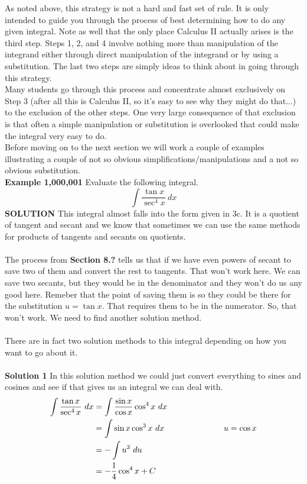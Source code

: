 \documentclass[11pt]{report}
\newlength\tindent
\renewcommand{\indent}{\hspace*{\tindent}}
\begin{document}

As noted above, this strategy is not a hard and fast set of rule. It is only intended to guide you through the process of best determining how to do any given integral. Note as well that the only place Calculus II actually arises is the third step. Steps 1, 2, and 4 involve nothing more than manipulation of the integrand either through direct manipulation of the integrand or by using a substitution. The last two steps are simply ideas to think about in going through this strategy.\\

Many students go through this process and concentrate almost exclusively on Step 3 (after all this is Calculus II, so it's easy to see why they might do that...) to the exclusion of the other steps. One very large consequence of that exclusion is that often a simple manipulation or substitution is overlooked that could make the integral very easy to do.\\

Before moving on to the next section we will work a couple of examples illustrating a couple of not so obvious simplifications/manipulations and a not so obvious substitution.\\

\textbf{Example 1,000,001} Evaluate the following integral. $$\int \frac{\tan x}{\sec^4 x}~dx$$
\textbf{SOLUTION} \indent This integral almost falls into the form given in 3c. It is a quotient of tangent and secant and we know that sometimes we can use the same methods for products of tangents and secants on quotients.\\ \\
The process from \textbf{Section 8.?} tells us that if we have even powers of secant to save two of them and convert the rest to tangents. That won't work here. We can save two secants, but they would be in the denominator and they won't do us any good here. Remeber that the point of saving them is so they could be there for the substitution $u = \tan x$. That requires them to be in the numerator. So, that won't work. We need to find another solution method.\\ \\
There are in fact two solution methods to this integral depending on how you want to go about it.\\ \\
\textbf{Solution 1} \indent In this solution method we could just convert everything to sines and cosines and see if that gives us an integral we can deal with.
\begin{align*}
\int \frac{\tan x}{\sec^4 x}~dx &= \int \frac{\sin x}{\cos x} \cos^4 x ~dx\\
&= \int \sin x \cos^3 x ~dx \hskip 1 truein u = \cos x\\
&= -\int u^3 ~du \\
&=-\frac{1}{4} \cos^4 x +C
\end{align*}
\end{document}
